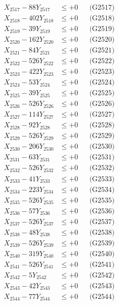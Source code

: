 \documentclass[a4paper,10pt]{article}
\begin{document}
{\begin{align}
X_{2517} - 88Y_{2517} &\leq +0 && \text{(G2517)} \\
X_{2518} - 402Y_{2518} &\leq +0 && \text{(G2518)} \\
X_{2519} - 39Y_{2519} &\leq +0 && \text{(G2519)} \\
X_{2520} - 162Y_{2520} &\leq +0 && \text{(G2520)} \\
\allowbreak
X_{2521} - 84Y_{2521} &\leq +0 && \text{(G2521)} \\
X_{2522} - 526Y_{2522} &\leq +0 && \text{(G2522)} \\
X_{2523} - 422Y_{2523} &\leq +0 && \text{(G2523)} \\
X_{2524} - 53Y_{2524} &\leq +0 && \text{(G2524)} \\
X_{2525} - 39Y_{2525} &\leq +0 && \text{(G2525)} \\
X_{2526} - 526Y_{2526} &\leq +0 && \text{(G2526)} \\
X_{2527} - 114Y_{2527} &\leq +0 && \text{(G2527)} \\
X_{2528} - 92Y_{2528} &\leq +0 && \text{(G2528)} \\
X_{2529} - 526Y_{2529} &\leq +0 && \text{(G2529)} \\
X_{2530} - 206Y_{2530} &\leq +0 && \text{(G2530)} \\
\allowbreak
X_{2531} - 63Y_{2531} &\leq +0 && \text{(G2531)} \\
X_{2532} - 526Y_{2532} &\leq +0 && \text{(G2532)} \\
X_{2533} - 41Y_{2533} &\leq +0 && \text{(G2533)} \\
X_{2534} - 223Y_{2534} &\leq +0 && \text{(G2534)} \\
X_{2535} - 526Y_{2535} &\leq +0 && \text{(G2535)} \\
X_{2536} - 57Y_{2536} &\leq +0 && \text{(G2536)} \\
X_{2537} - 526Y_{2537} &\leq +0 && \text{(G2537)} \\
X_{2538} - 48Y_{2538} &\leq +0 && \text{(G2538)} \\
X_{2539} - 526Y_{2539} &\leq +0 && \text{(G2539)} \\
X_{2540} - 319Y_{2540} &\leq +0 && \text{(G2540)} \\
\allowbreak
X_{2541} - 526Y_{2541} &\leq +0 && \text{(G2541)} \\
X_{2542} - 5Y_{2542} &\leq +0 && \text{(G2542)} \\
X_{2543} - 42Y_{2543} &\leq +0 && \text{(G2543)} \\
X_{2544} - 77Y_{2544} &\leq +0 && \text{(G2544)} \\

\end{align}}
\end{document}

